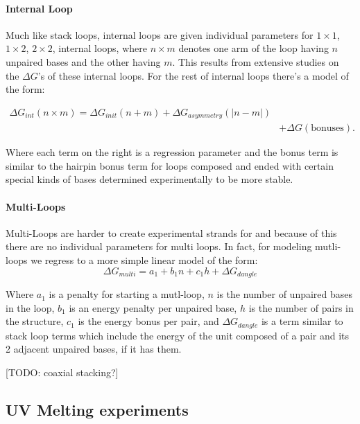 \paragraph{Internal Loop}
Much like stack loops, internal loops are given individual parameters
for $1 \times 1$, $1 \times 2$, $2 \times 2$, internal loops, where $n
\times m$ denotes one arm of the loop having $n$ unpaired bases and
the other having $m$. This results from extensive studies on the
$\Delta G$'s of these internal loops. For the rest of internal loops
there's a model of the form:

\begin{align}
 \Delta G_{int} ( n \times m ) = \Delta G_{init} (n + m) + \Delta G_{asymmetry} (| n - m |) \\
& + \Delta G ( \text{bonuses}).
\end{align}

Where each term on the right is a regression parameter and the bonus
term is similar to the hairpin bonus term for loops composed and ended
with certain special kinds of bases determined experimentally to be
more stable.

\paragraph{Multi-Loops}
Multi-Loops are harder to create experimental strands for and because
of this there are no individual parameters for multi loops. In fact,
for modeling mutli-loops we regress to a more simple linear model of the form:
\begin{equation}
\Delta G_{multi} = a_1 + b_1 n + c_1 h + \Delta G_{dangle}
\end{equation}

Where $a_1$ is a penalty for starting a mutl-loop, $n$ is the number
of unpaired bases in the loop, $b_1$ is an energy penalty per unpaired
base, $h$ is the number of pairs in the structure, $c_1$ is the energy
bonus per pair, and $\Delta G_{dangle}$ is a term similar to stack
loop terms which include the energy of the unit composed of a pair and
its 2 adjacent unpaired bases, if it has them.

[TODO: coaxial stacking?]

\subsection{UV Melting experiments}

